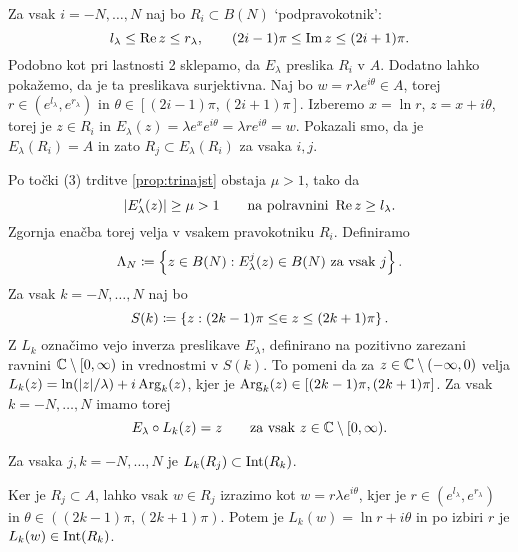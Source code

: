 \noindent Za vsak \(i = -N, \dots, N\) naj bo \(R_i \subset B (N)\) `podpravokotnik':
\[l_\lambda \leq \operatorname{Re} z \leq r_\lambda, \qquad (2i - 1) \pi \leq \operatorname{Im} z \leq (2i + 1) \pi.\]
Podobno kot pri lastnosti 2 sklepamo, da \(E_\lambda\) preslika \(R_i\) v \(A\). Dodatno lahko pokažemo, da je ta preslikava surjektivna. Naj bo \(w = r \lambda e^{i \theta} \in A\), torej \(r \in (e^{l_\lambda}, e^{r_\lambda})\) in \(\theta \in [(2i - 1) \pi, (2i + 1) \pi]\). Izberemo \(x = \ln r\), \(z = x + i \theta\), torej je \(z \in R_i\) in \(E_\lambda (z) = \lambda e^x e^{i \theta} = \lambda r e^{i \theta} = w\). Pokazali smo, da je \(E_\lambda (R_i) = A\) in zato \(R_j \subset E_\lambda (R_i)\) za vsaka \(i, j\).

Po točki (3) trditve \ref{prop:trinajst} obstaja \(\mu > 1\), tako da
\begin{equation} \label{eqn:mu-ocena}
    |E_\lambda' (z)| \geq \mu > 1 \qquad \text{na polravnini } \operatorname{Re} z \geq l_\lambda.
\end{equation}
Zgornja enačba torej velja v vsakem pravokotniku \(R_i\). Definiramo
\[\Lambda_N \coloneq \left\{ z \in B(N) : E_\lambda^j (z) \in B (N) \text{ za vsak } j \right\}.\]
Za vsak \(k = -N, \dots, N\) naj bo
\[S (k) \coloneq \left\{ z : (2k - 1) \pi \leq \in z \leq (2k + 1) \pi \right\}.\]
Z \(L_k\) označimo vejo inverza preslikave \(E_\lambda\), definirano na pozitivno zarezani ravnini \(\mathbb C \setminus [0, \infty)\) in vrednostmi v \(S (k)\). To pomeni da za \(z \in \mathbb C \setminus (- \infty, 0)\) velja \(L_k (z) = \ln (|z| / \lambda) + i \operatorname{Arg}_k (z)\), kjer je \(\operatorname{Arg}_k (z) \in [(2k - 1) \pi, (2k + 1) \pi]\). Za vsak \(k = - N, \dots, N\) imamo torej
\begin{equation} \label{eqn:inverz-e}
    E_\lambda \circ L_k (z) = z \qquad \text{za vsak } z \in \mathbb C \setminus [0, \infty).
\end{equation}

\begin{trditev} \label{prop:claim}
    Za vsaka \(j, k = -N, \dots, N\) je \(L_k (R_j) \subset \operatorname{Int} (R_k)\).
\end{trditev}

\begin{dokaz}
    Ker je \(R_j \subset A\), lahko vsak \(w \in R_j\) izrazimo kot \(w = r \lambda e^{i \theta}\), kjer je \(r \in (e^{l_\lambda}, e^{r_\lambda})\) in \(\theta \in ((2k - 1) \pi, (2k + 1) \pi)\). Potem je \(L_k (w) = \ln r + i \theta\) in po izbiri \(r\) je \(L_k (w) \in \operatorname{Int} (R_k)\).
\end{dokaz}

